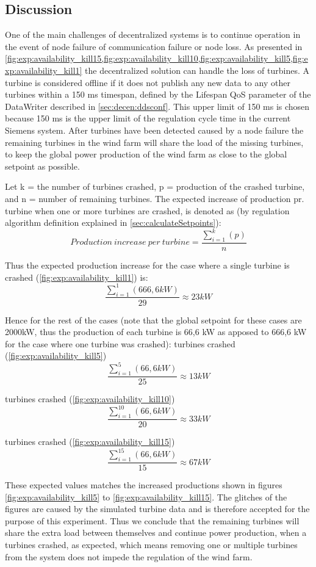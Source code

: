 \subsection{Discussion}
One of the main challenges of decentralized systems is to continue operation in the event of node failure of communication failure or node loss. As presented in  \cref{fig:exp:availability_kill15,fig:exp:availability_kill10,fig:exp:availability_kill5,fig:exp:availability_kill1} the decentralized solution can handle the loss of turbines. A turbine is considered offline if it does not publish any new data to any other turbines within a 150 ms timespan, defined by the Lifespan QoS parameter of the DataWriter described in \cref{sec:decen:ddsconf}.
This upper limit of 150 ms is chosen because 150 ms is the upper limit of the regulation cycle time in the current Siemens system.
After turbines have been detected caused by a node failure the remaining turbines in the wind farm will share the load of the missing turbines, to keep the global power production of the wind farm as close to the global setpoint as possible.

Let k = the number of turbines crashed, p = production of the crashed turbine, and n = number of remaining turbines. The expected increase of production pr. turbine when one or more turbines are crashed, is denoted as (by regulation algorithm definition explained in \cref{sec:calculateSetpoints}): $$Production~increase~per~turbine = \frac{\sum\limits_{i=1}^k(p)}{n}$$

Thus the expected production increase for the case where a single turbine is crashed (\cref{fig:exp:availability_kill1}) is: $$\frac{\sum\limits_{i=1}^1(666,6kW)}{29}\approx23kW$$

Hence for the rest of the cases (note that the global setpoint for these cases are 2000kW, thus the production of each turbine is 66,6 kW as apposed to 666,6 kW for the case where one turbine was crashed):
\newline\newline
{} turbines crashed (\cref{fig:exp:availability_kill5}) $$\frac{\sum\limits_{i=1}^5(66,6kW)}{25}\approx13kW$$

 turbines crashed (\cref{fig:exp:availability_kill10}) $$\frac{\sum\limits_{i=1}^{10}(66,6kW)}{20}\approx33kW$$

 turbines crashed (\cref{fig:exp:availability_kill15}) $$\frac{\sum\limits_{i=1}^{15}(66,6kW)}{15}\approx67kW$$

These expected values matches the increased productions shown in figures \ref{fig:exp:availability_kill5} to \ref{fig:exp:availability_kill15}. The glitches of the figures are caused by the simulated turbine data and is therefore accepted for the purpose of this experiment. Thus we conclude that the remaining turbines will share the extra load between themselves and continue power production, when a turbines crashed, as expected, which means removing one or multiple turbines from the system does not impede the regulation of the wind farm.

